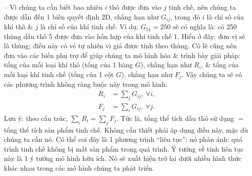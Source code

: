 \documentclass{article}
\begin{document}
\begin{itemize}
\begin{itemize}
\begin{itemize}
            -- Vì chúng ta cần biết bao nhiêu $i$ thô được đưa vào $j$ tinh chế, nên chúng ta được dẫn đến 1 biến quyết định 2D, chẳng hạn như $G_{ij}$, trong đó $i$ là chỉ số của khí thô \& $j$ là chỉ số của khí tinh chế. Ví dụ: $G_{51} = 250$ sẽ có nghĩa là: có 250 thùng dầu thô 5 được đưa vào hỗn hợp của khí tinh chế 1. Hiểu ở đây: đơn vị sẽ là thùng; điều này có vẻ tự nhiên vì giá được tính theo thùng. Có lẽ cũng nên đưa vào các biến phụ trợ để giúp chúng ta mô hình hóa \& trình bày giải pháp: tổng của mỗi loại khí thô (tổng của 1 hàng $G$), chẳng hạn như $R_i$, \& tổng của mỗi loại khí tinh chế (tổng của 1 cột $G$), chẳng hạn như $F_j$. Vậy chúng ta sẽ có các phương trình không ràng buộc này trong mô hình:
            \begin{align*}
                R_i &= \sum_j G_{ij},\ \forall i,\\
                F_j &= \sum_i G_{ij},\ \forall j.
            \end{align*}
            Lưu ý: theo cấu trúc, $\sum_i R_i = \sum_j F_j$. Tức là, tổng thể tích dầu thô sử dụng $=$ tổng thể tích sản phẩm tinh chế. Không cần thiết phải áp dụng điều này, mặc dù chúng ta cần nó. Có thể coi đây là 1 phương trình ``liên tục'': nó phản ánh: quá trình tinh chế không bị mất sản phẩm trong quá trình. Ý tưởng về tính liên tục này là 1 ý tưởng mô hình hữu ích. Nó sẽ xuất hiện trở lại dưới nhiều hình thức khác nhau trong các mô hình chúng ta phát triển.


\end{itemize}
\end{itemize}
\end{itemize}
\end{document}
